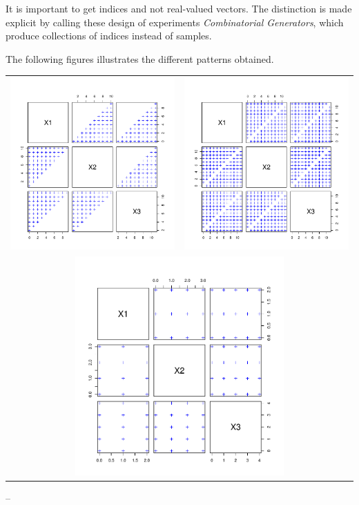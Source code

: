 {      It is important to get indices and not real-valued vectors. The distinction is made explicit by calling these design of experiments \emph{Combinatorial Generators}, which produce collections of indices instead of samples.

      The following figures illustrates the different patterns obtained.
      \newpage
      \begin{center}
        \begin{tabular}{cc}
          \includegraphics[width=8cm]{Figures/Combinations_DOE.pdf} & \includegraphics[width=8cm]{Figures/KPermutations_DOE.pdf}\\
          \multicolumn{2}{c}{\includegraphics[width=8cm]{Figures/Tuples_DOE.pdf}}
        \end{tabular}
      \end{center}
    }
    {
      --
    }

